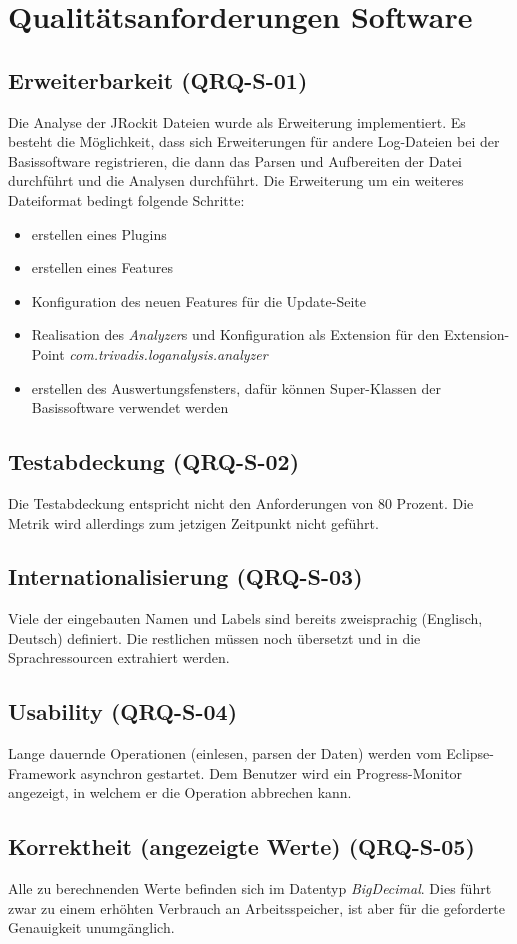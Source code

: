 \section{Qualitätsanforderungen Software}
\subsection{Erweiterbarkeit (QRQ-S-01)}
Die Analyse der JRockit Dateien wurde als Erweiterung implementiert. Es besteht die Möglichkeit, dass sich Erweiterungen für andere Log-Dateien bei der Basissoftware registrieren, die dann das Parsen und Aufbereiten der Datei durchführt und die Analysen durchführt. Die Erweiterung um ein weiteres Dateiformat bedingt folgende Schritte:
\begin{itemize}
\item erstellen eines Plugins
\item erstellen eines Features
\item Konfiguration des neuen Features für die Update-Seite
\item Realisation des \textit{Analyzer}s und Konfiguration als Extension für den Extension-Point \textit{com.trivadis.loganalysis.analyzer}
\item erstellen des Auswertungsfensters, dafür können Super-Klassen der Basissoftware verwendet werden
\end{itemize}

\subsection{Testabdeckung (QRQ-S-02)}
Die Testabdeckung entspricht nicht den Anforderungen von 80 Prozent. Die Metrik wird allerdings zum jetzigen Zeitpunkt nicht geführt.
\subsection{Internationalisierung (QRQ-S-03)}
Viele der eingebauten Namen und Labels sind bereits zweisprachig (Englisch, Deutsch) definiert. Die restlichen müssen noch übersetzt und in die Sprachressourcen extrahiert werden.

\subsection{Usability (QRQ-S-04)}
Lange dauernde Operationen (einlesen, parsen der Daten) werden vom Eclipse-Framework asynchron gestartet. Dem Benutzer wird ein Progress-Monitor angezeigt, in welchem er die Operation abbrechen kann.

\subsection{Korrektheit (angezeigte Werte) (QRQ-S-05)}
Alle zu berechnenden Werte befinden sich im Datentyp \textit{BigDecimal}. Dies führt zwar zu einem erhöhten Verbrauch an Arbeitsspeicher, ist aber für die geforderte Genauigkeit unumgänglich.